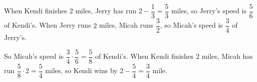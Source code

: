 When Kendi finishes $2$ miles, Jerry has run $2-\dfrac{1}{3}=\dfrac{5}{3}$ miles, so Jerry's speed is $\dfrac{5}{6}$ of Kendi's. When Jerry runs $2$ miles, Micah runs $\dfrac{3}{2}$, so Micah's speed is $\dfrac{3}{4}$ of Jerry's.

So Micah's speed is $\dfrac{3}{4}\cdot\dfrac{5}{6}=\dfrac{5}{8}$ of Kendi's. When Kendi finishes $2$ miles, Micah has run $\dfrac{5}{8}\cdot2=\dfrac{5}{4}$ miles, so Kendi wins by $2-\dfrac{5}{4}=\boxed{\dfrac{3}{4}}$ mile.
